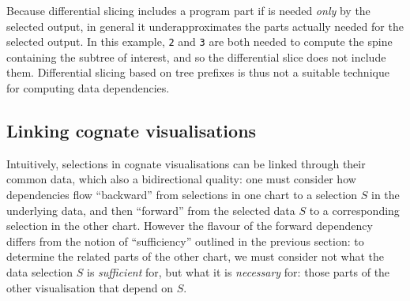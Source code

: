 

\noindent Because differential slicing includes a program part if is needed \emph{only} by the selected output, in general it underapproximates the parts actually needed for the selected output. In this example, \lstinline{2} and \lstinline{3} are both needed to compute the spine containing the subtree of interest, and so the differential slice does not include them. Differential slicing based on tree prefixes is thus not a suitable technique for computing data dependencies.

\subsection{Linking cognate visualisations}

Intuitively, selections in cognate visualisations can be linked through their common data, which also a bidirectional quality: one must consider how dependencies flow ``backward'' from selections in one chart to a selection $S$ in the underlying data, and then ``forward'' from the selected data $S$ to a corresponding selection in the other chart. However the flavour of the forward dependency differs from the notion of ``sufficiency'' outlined in the previous section: to determine the related parts of the other chart, we must consider not what the data selection $S$ is \emph{sufficient} for, but what it is \emph{necessary} for: those parts of the other visualisation that depend on $S$.

